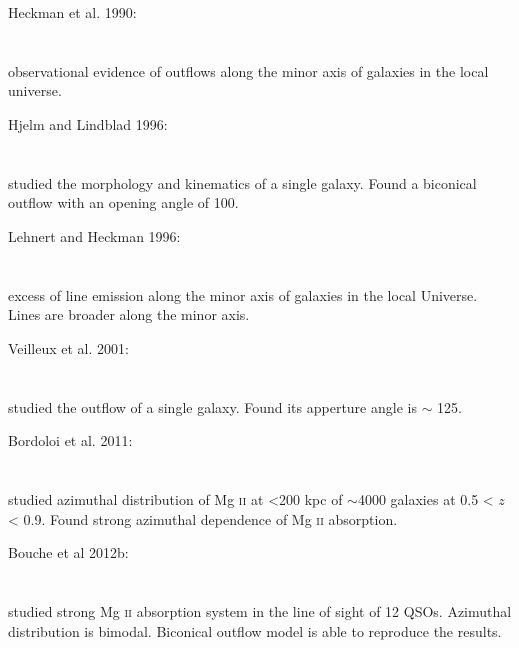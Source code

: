 Heckman et al. 1990: \\
\citet{1990ApJS...74..833H} \\
\citep{1990ApJS...74..833H} \\
observational evidence of outflows along the minor axis of galaxies in the local
universe. \\

\hline

Hjelm and Lindblad 1996: \\
\citet{1996A&A...305..727H} \\
\citep{1996A&A...305..727H} \\
studied the morphology and kinematics of a single galaxy. Found a biconical
outflow with an opening angle of 100\º. \\

\hline

Lehnert and Heckman 1996: \\
\citet{1996ApJ...462..651L} \\
\citep{1996ApJ...462..651L} \\
excess of line emission along the minor axis of galaxies in the local Universe.
Lines are broader along the minor axis. \\

\hline

Veilleux et al. 2001: \\
\citet{2001AJ....121..198V} \\
\citep{2001AJ....121..198V} \\
studied the outflow of a single galaxy. Found its apperture angle is $\sim$
125\º. \\

\hline

Bordoloi et al. 2011: \\
\citet{2011ApJ...743...10B} \\
\citep{2011ApJ...743...10B} \\
studied azimuthal distribution of Mg \textsc{ii} at <200 kpc of $\sim$4000
galaxies at 0.5 < $z$ < 0.9. Found strong azimuthal dependence of Mg \textsc{ii}
absorption. \\

\hline

Bouche et al 2012b: \\
\citet{2012MNRAS.426..801B} \\
\citep{2012MNRAS.426..801B} \\
studied strong Mg \textsc{ii} absorption system in the line of sight of 12 QSOs.
Azimuthal distribution is bimodal. Biconical outflow model is able to reproduce
the results. \\


